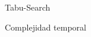 \begin{section}{Tabu-Search}
		\begin{subsection}{Complejidad temporal}		
		\end{subsection}

\end{section}
